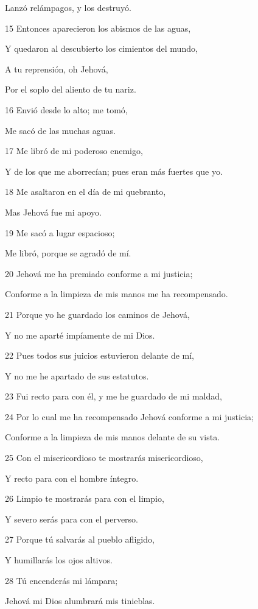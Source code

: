 \par Lanzó relámpagos, y los destruyó.
\par 15 Entonces aparecieron los abismos de las aguas,
\par Y quedaron al descubierto los cimientos del mundo,
\par A tu reprensión, oh Jehová,
\par Por el soplo del aliento de tu nariz.
\par 16 Envió desde lo alto; me tomó,
\par Me sacó de las muchas aguas.
\par 17 Me libró de mi poderoso enemigo,
\par Y de los que me aborrecían; pues eran más fuertes que yo.
\par 18 Me asaltaron en el día de mi quebranto,
\par Mas Jehová fue mi apoyo.
\par 19 Me sacó a lugar espacioso;
\par Me libró, porque se agradó de mí.
\par 20 Jehová me ha premiado conforme a mi justicia;
\par Conforme a la limpieza de mis manos me ha recompensado.
\par 21 Porque yo he guardado los caminos de Jehová,
\par Y no me aparté impíamente de mi Dios.
\par 22 Pues todos sus juicios estuvieron delante de mí,
\par Y no me he apartado de sus estatutos.
\par 23 Fui recto para con él, y me he guardado de mi maldad,
\par 24 Por lo cual me ha recompensado Jehová conforme a mi justicia;
\par Conforme a la limpieza de mis manos delante de su vista.
\par 25 Con el misericordioso te mostrarás misericordioso,
\par Y recto para con el hombre íntegro.
\par 26 Limpio te mostrarás para con el limpio,
\par Y severo serás para con el perverso.
\par 27 Porque tú salvarás al pueblo afligido,
\par Y humillarás los ojos altivos.
\par 28 Tú encenderás mi lámpara;
\par Jehová mi Dios alumbrará mis tinieblas.
